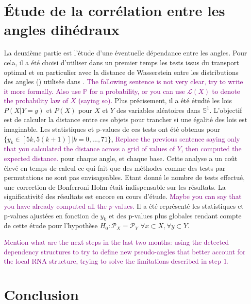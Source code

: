 \documentclass[a4paper,12pt]{article}
\newcommand{\Javier}[1]{\textcolor{purple}{#1}}
\begin{document}
\section{Étude de la corrélation entre les angles dihédraux}

\Javier{}

La deuxième partie est l'étude d'une éventuelle dépendance entre les angles. Pour cela, il a été choisi d'utiliser dans un premier temps les tests issus du transport optimal et en particulier avec la distance de Wasserstein entre les distributions des angles (\cite{peyreComputationalOptimalTransport2020}) utilisée dans  \cite{gonzalez-delgadoTwosampleGoodnessoffitTests2023}. \Javier{The following sentence is not very clear, try to write it more formally. Also use $\mathbb{P}$ for a probability, or you can use $\mathcal{L}(X)$ to denote the probability law of $X$ (saying so).} Plus précisement, il a été étudié les lois $P(X|Y=y)$ et $P(X)$ pour $X$ et $Y$ des variables aléatoires dans $\mathbb{S}^1$. L'objectif est de calculer la distance  entre ces objets  pour trancher si  une égalité des lois est imaginable. Les statistiques et p-values de ces tests ont été obtenus pour $\{y_k \in [5k, 5(k+1)] | k = 0,..., 71\}$, \Javier{Replace the previous sentence saying only that you calculated the distance across a grid of values of $Y$, then computed the expected distance.} pour chaque angle, et chaque base. Cette analyse a un coût élevé en temps de calcul ce qui fait que des méthodes comme des tests par permutations ne sont pas envisageables. Etant donné le nombre de tests effectué, une correction de Bonferroni-Holm était indispensable sur les résultats. La significativité des résultats est encore en cours d'étude. \Javier{Maybe you can say that you have already computed all the $p$-values.}
Il a été représenté les statistiques et p-values ajustées en fonction de $y_k$ et des p-values plus globales rendant compte de cette étude pour l'hypothèse $H_0 : \mathcal{P}_X = \mathcal{P}_Y$ $\forall x\subset X,\forall y\subset Y$.

\Javier{Mention what are the next steps in the last two months: using the detected dependency structures to try to define new pseudo-angles that better account for the local RNA structure, trying to solve the limitations described in step 1.}

\section{Conclusion}
\end{document}
